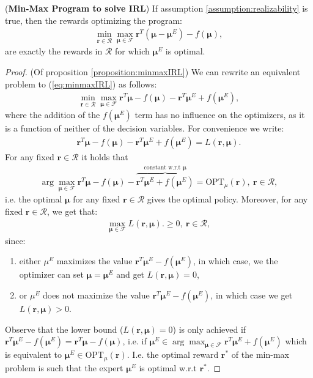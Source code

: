 \begin{proposition}
    \label{proposition:minmaxIRL}
    (\textbf{Min-Max Program to solve IRL})
    If assumption \ref{assumption:realizability} is true, then the rewards optimizing the program:
    \begin{equation}
        \label{eq:minmaxIRL}
        \begin{aligned}
            \min_{\bm{r}\in\mathcal{R}}\max_{\bm{\mu}\in\mathcal{F}} \bm{r}^T(\bm{\mu}-\bm{\mu}^E)-f(\bm{\mu}),
        \end{aligned}
    \end{equation}
    are exactly the rewards in $\mathcal{R}$ for which $\bm{\mu}^E$ is optimal.
\end{proposition}
\begin{proof}
    (Of proposition \ref{proposition:minmaxIRL}) We can rewrite an equivalent problem to (\ref{eq:minmaxIRL}) as follows:
    \begin{align*}
        \min_{\bm{r}\in\mathcal{R}}\max_{\bm{\mu}\in\mathcal{F}} \bm{r}^T\bm{\mu}-f(\bm{\mu}) - \bm{r}^T \bm{\mu}^E + f(\bm{\mu}^E),
    \end{align*}
    where the addition of the $f(\bm{\mu}^E)$ term has no influence on the optimizers, as it is a function of neither of the decision variables. For convenience we write:
    \begin{align*}
        \bm{r}^T\bm{\mu}-f(\bm{\mu}) - \bm{r}^T \bm{\mu}^E + f(\bm{\mu}^E) = L(\bm{r},\bm{\mu}).
    \end{align*}
    For any fixed $\bm{r}\in\mathcal{R}$ it holds that 
    \begin{align*}
        \arg\max_{\bm{\mu}\in\mathcal{F}} \bm{r}^T\bm{\mu}-f(\bm{\mu}) - \overbrace{\bm{r}^T \bm{\mu}^E + f(\bm{\mu}^E)}^\text{constant w.r.t $\bm{\mu}$} = \text{OPT}_\mu(\bm{r}), ~\bm{r}\in \mathcal{R},
    \end{align*}
    i.e. the optimal $\bm{\mu}$ for any fixed $\bm{r} \in \mathcal{R}$ gives the optimal policy. Moreover, for any fixed $\bm{r} \in \mathcal{R}$, we get that:
    \begin{align*}
        \max_{\bm{\mu}\in\mathcal{F}} L(\bm{r},\bm{\mu}).\geq 0, ~\bm{r}\in \mathcal{R},
    \end{align*}
    since:
    \begin{enumerate}
        \item either $\mu^E$ maximizes the value $\bm{r}^T \bm{\mu}^E - f(\bm{\mu}^E)$, in which case, we the optimizer can set $\bm{\mu} = \bm{\mu}^E$ and get $ L(\bm{r},\bm{\mu})=0$,
        \item or  $\mu^E$ does not maximize the value $\bm{r}^T \bm{\mu}^E - f(\bm{\mu}^E)$, in  which case we get $ L(\bm{r},\bm{\mu})>0$.
    \end{enumerate}
    Observe that the lower bound ($ L(\bm{r},\bm{\mu})=0$) is only achieved if $\bm{r}^T \bm{\mu}^E - f(\bm{\mu}^E)=\bm{r}^T \bm{\mu} - f(\bm{\mu})$, i.e. if $\bm{\mu}^E \in \arg \max_{\bm{\mu} \in \mathcal{F}} \bm{r}^T \bm{\mu}^E + f(\bm{\mu}^E)$ which is equivalent to $\bm{\mu}^E \in  \text{OPT}_\mu(\bm{r})$. I.e. the optimal reward $\bm{r}^*$ of the min-max problem is such that the expert $\bm{\mu}^E$ is optimal w.r.t $\bm{r}^*$.
    
\end{proof}

